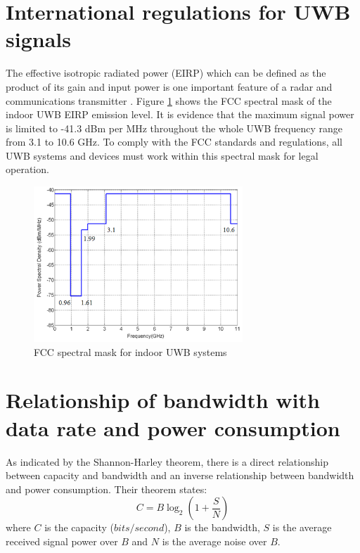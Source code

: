 \documentclass[\main/main.tex]{subfiles}
\begin{document}
\section{International regulations for UWB signals}

The effective isotropic radiated power (EIRP) which can be defined as the product of its gain and input power is one important feature of a radar and communications transmitter . Figure \ref{fig:fcc_spectral_mask_for_indoor_uwb_systems} shows the FCC spectral mask of the indoor UWB EIRP emission level. It is evidence that the maximum signal power is limited to -41.3 dBm per MHz throughout the whole UWB frequency range from 3.1 to 10.6 GHz. To comply with the FCC standards and regulations, all UWB systems and devices must work within this spectral mask for legal operation.

\begin{figure}[H]
    \centering
    \includegraphics[width=0.7\textwidth]{fcc_spectral_mask_for_indoor_uwb_systems}
    \caption{FCC spectral mask for indoor UWB systems}
    \label{fig:fcc_spectral_mask_for_indoor_uwb_systems}
\end{figure}

\section{Relationship of bandwidth with data rate and power consumption}
As indicated by the Shannon-Harley theorem, there is a direct relationship between capacity and bandwidth and an inverse relationship between bandwidth and power consumption. Their theorem states: 
\begin{equation}
    C=B\log_2(1+\frac{S}{N})
\end{equation} where $C$ is the capacity ($bits/second$), $B$ is the bandwidth, $S$ is the average received signal power over $B$ and $N$ is the average noise over $B$. 
\end{document}

